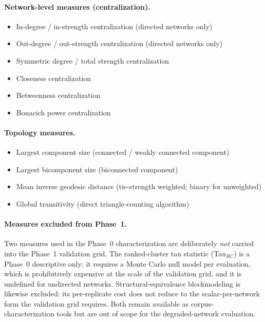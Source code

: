 \documentclass[11pt]{article}
\begin{document}
\paragraph{Network-level measures (centralization).}
\begin{itemize}[leftmargin=*, itemsep=2pt]
  \item In-degree / in-strength centralization (directed networks only)
  \item Out-degree / out-strength centralization (directed networks only)
  \item Symmetric degree / total strength centralization
  \item Closeness centralization
  \item Betweenness centralization
  \item Bonacich power centralization
\end{itemize}

\paragraph{Topology measures.}
\begin{itemize}[leftmargin=*, itemsep=2pt]
  \item Largest component size (connected / weakly connected component)
  \item Largest bicomponent size (biconnected component)
  \item Mean inverse geodesic distance (tie-strength weighted; binary for unweighted)
  \item Global transitivity (direct triangle-counting algorithm)
\end{itemize}

\paragraph{Measures excluded from Phase~1.} Two measures used in the Phase~0 characterization are deliberately \emph{not} carried into the Phase~1 validation grid. The ranked-cluster tau statistic (Tau$_{RC}$) is a Phase~0 descriptive only: it requires a Monte Carlo null model per evaluation, which is prohibitively expensive at the scale of the validation grid, and it is undefined for undirected networks. Structural-equivalence blockmodeling is likewise excluded: its per-replicate cost does not reduce to the scalar-per-network form the validation grid requires. Both remain available as corpus-characterization tools but are out of scope for the degraded-network evaluation.
\end{document}
